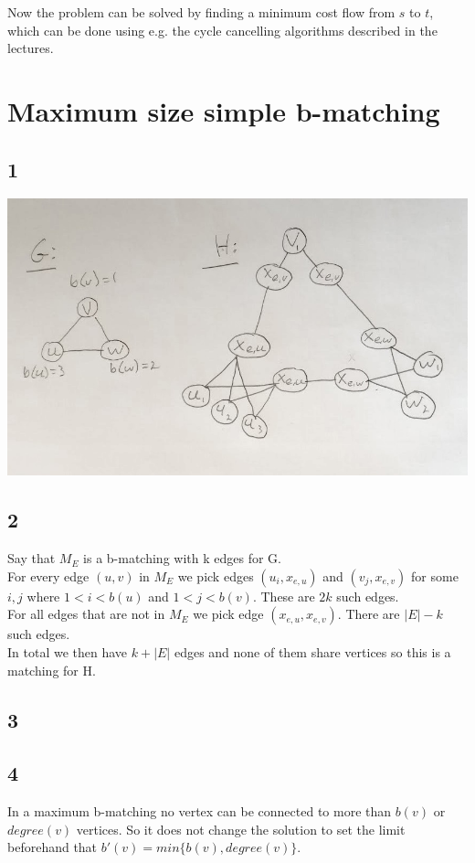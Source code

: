 \documentclass[a4paper]{article}
\begin{document}
Now the problem can be solved by finding a minimum cost flow from $s$ to $t$, which can be done using e.g. the cycle cancelling algorithms described in the lectures.
\section{Maximum size simple b-matching}
\subsection*{1}
\includegraphics[width=\textwidth]{5}
\subsection*{2}
Say that $M_E$ is a b-matching with k edges for G. \\
For every edge $(u,v)$ in $M_E$ we pick edges $(u_i,x_{e,u})$ and $(v_j,x_{e,v})$ for some $i,j$ where $1<i<b(u)$ and $1<j<b(v)$. These are $2k$ such edges.\\
For all edges that are not in $M_E$ we pick edge $(x_{e,u},x_{e,v})$. There are $|E| - k$ such edges.\\
In total we then have $k+|E|$ edges and none of them share vertices so this is a matching for H.
\subsection*{3}

\subsection*{4}
In a maximum b-matching no vertex can be connected to more than $b(v)$ or $degree(v)$ vertices. So it does not change the solution to set the limit beforehand that $b'(v)=min\{b(v),degree(v)\}$.
\end{document}
